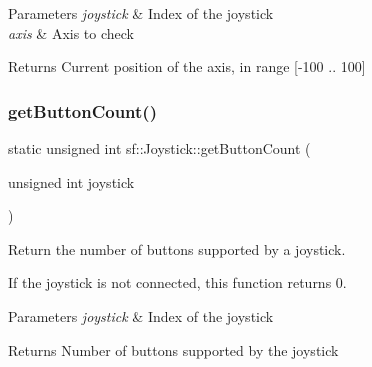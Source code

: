 \begin{DoxyParams}{Parameters}
{\em joystick} & Index of the joystick \\
\hline
{\em axis} & Axis to check\\
\hline
\end{DoxyParams}
\begin{DoxyReturn}{Returns}
Current position of the axis, in range \mbox{[}-\/100 .. 100\mbox{]} \begin{DoxyVerb}\end{DoxyVerb}
 
\end{DoxyReturn}
\mbox{\label{classsf_1_1_joystick_a4de9f445c6582bfe9f0873f695682885}} 
\subsubsection{\texorpdfstring{getButtonCount()}{getButtonCount()}}
{\footnotesize\ttfamily static unsigned int sf\+::\+Joystick\+::get\+Button\+Count (\begin{DoxyParamCaption}\item[{unsigned int}]{joystick }\end{DoxyParamCaption})\hspace{0.3cm}{\ttfamily [static]}}



Return the number of buttons supported by a joystick. 

If the joystick is not connected, this function returns 0.


\begin{DoxyParams}{Parameters}
{\em joystick} & Index of the joystick\\
\hline
\end{DoxyParams}
\begin{DoxyReturn}{Returns}
Number of buttons supported by the joystick \begin{DoxyVerb}\end{DoxyVerb}
 
\end{DoxyReturn}
\mbox{\label{classsf_1_1_joystick_aa917c9435330e6e0368d3893672d1b74}} 
